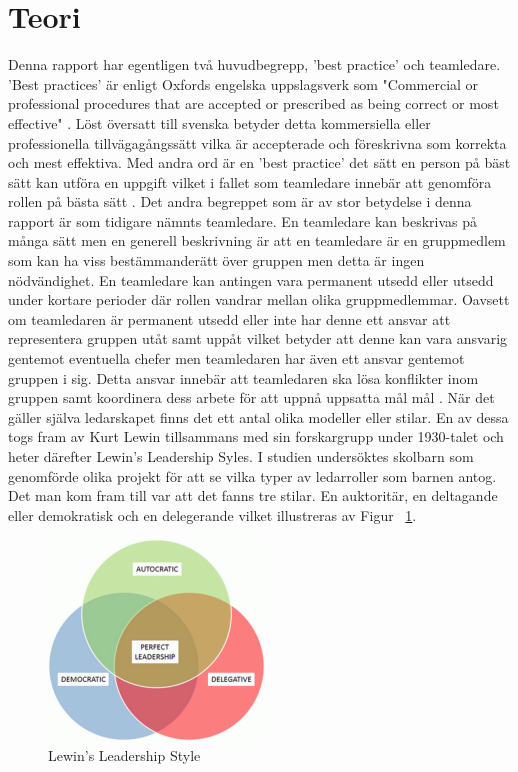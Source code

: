 \section{Teori}
Denna rapport har egentligen två huvudbegrepp, 'best practice' och teamledare. 'Best practices' är enligt Oxfords engelska uppslagsverk som "Commercial or professional procedures that are accepted or prescribed as being correct or most effective" \cite{OD}. Löst översatt till svenska betyder detta kommersiella eller professionella tillvägagångssätt vilka är accepterade och föreskrivna som korrekta och mest effektiva. Med andra ord är en 'best practice' det sätt en person på bäst sätt kan utföra en uppgift vilket i fallet som teamledare innebär att genomföra rollen på bästa sätt \cite{itSMF}. 
\newline \newline
Det andra begreppet som är av stor betydelse i denna rapport är som tidigare nämnts teamledare. En teamledare kan beskrivas på många sätt men en generell beskrivning är att en teamledare är en gruppmedlem som kan ha viss bestämmanderätt över gruppen men detta är ingen nödvändighet. En teamledare kan antingen vara permanent utsedd eller utsedd under kortare perioder där rollen vandrar mellan olika gruppmedlemmar. Oavsett om teamledaren är permanent utsedd eller inte har denne ett ansvar att representera gruppen utåt samt uppåt vilket betyder att denne kan vara ansvarig gentemot eventuella chefer men teamledaren har även ett ansvar gentemot gruppen i sig. Detta ansvar innebär att teamledaren ska lösa konflikter inom gruppen samt koordinera dess arbete för att uppnå uppsatta mål mål \cite{BD}. 
\newline \newline
När det gäller själva ledarskapet finns det ett antal olika modeller eller stilar. En av dessa togs fram av Kurt Lewin tillsammans med sin forskargrupp under 1930-talet och heter därefter Lewin's Leadership Syles. I studien undersöktes skolbarn som genomförde olika projekt för att se vilka typer av ledarroller som barnen antog. Det man kom fram till var att det fanns tre stilar. En auktoritär, en deltagande eller demokratisk och en delegerande \cite{KAC} vilket illustreras av Figur ~\ref{fig:Lewin}. 
\begin{figure}[h]
\centerline{\includegraphics{adam-tex/graphic/leadership}}
\caption{Lewin's Leadership Style}
\label{fig:Lewin}
\end{figure}
